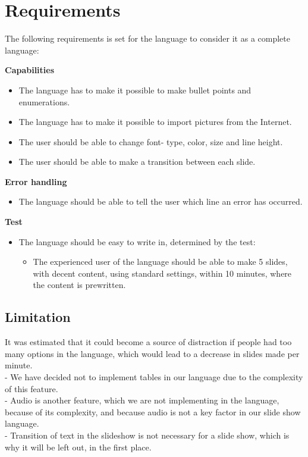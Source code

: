 \section{Requirements}
The following requirements is set for the language to consider it as a complete language:

\textbf{Capabilities}
\begin{itemize}
	\item The language has to make it possible to make bullet points and enumerations.\\
	\item The language has to make it possible to import pictures from the Internet.\\
	\item The user should be able to change font- type, color, size and line height.\\
	\item The user should be able to make a transition between each slide. \\
\end{itemize}
\textbf{Error handling}

\begin{itemize}
	\item The language should be able to tell the user which line an error has occurred. \\
\end{itemize}
\textbf{Test}

\begin{itemize}
	\item The language should be easy to write in, determined by the test:
\begin{itemize}
	\item The experienced user of the language should be able to make 5 slides, with decent content, using standard settings, within 10 minutes, where the content is prewritten.
\end{itemize}
\end{itemize}



\subsection{Limitation}

It was estimated that it could become a source of distraction if people had too many options in the language, which would lead to a decrease in slides made per minute.\\

- We have decided not to implement tables in our language due to the complexity of this feature.\\
- Audio is another feature, which we are not implementing in the language, because of its complexity, and because audio is not a key factor in our slide show language.\\
- Transition of text in the slideshow is not necessary for a slide show, which is why it will be left out, in the first place.